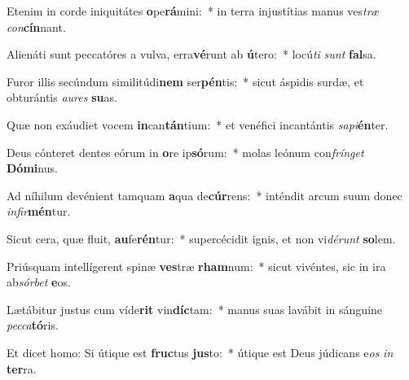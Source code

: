 \item Etenim in corde iniquitátes \textbf{o}pe\textbf{rá}mini:~* in terra injustítias manus ves\textit{træ} \textit{con}\textbf{cín}nant.
\item Alienáti sunt peccatóres a vulva, erra\textbf{vé}runt ab \textbf{ú}tero:~* locú\textit{ti} \textit{sunt} \textbf{fal}sa.
\item Furor illis secúndum similitúdi\textbf{nem} ser\textbf{pén}tis:~* sicut áspidis surdæ, et obturántis \textit{au}\textit{res} \textbf{su}as.
\item Quæ non exáudiet vocem \textbf{in}can\textbf{tán}tium:~* et venéfici incantántis \textit{sa}\textit{pi}\textbf{én}ter.
\item Deus cónteret dentes eórum in \textbf{o}re ip\textbf{só}rum:~* molas leónum con\textit{frín}\textit{get} \textbf{Dó}\textbf{mi}nus.
\item Ad níhilum devénient tamquam \textbf{a}qua de\textbf{cúr}rens:~* inténdit arcum suum donec \textit{in}\textit{fir}\textbf{mén}tur.
\item Sicut cera, quæ fluit, \textbf{au}fe\textbf{rén}tur:~* supercécidit ignis, et non vi\textit{dé}\textit{runt} \textbf{so}lem.
\item Priúsquam intellígerent spinæ \textbf{ves}træ \textbf{rham}num:~* sicut vivéntes, sic in ira ab\textit{sór}\textit{bet} \textbf{e}os.
\item Lætábitur justus cum víde\textbf{rit} vin\textbf{díc}tam:~* manus suas lavábit in sánguine \textit{pec}\textit{ca}\textbf{tó}ris.
\item Et dicet homo: Si útique est \textbf{fruc}tus \textbf{jus}to:~* útique est Deus júdicans e\textit{os} \textit{in} \textbf{ter}ra.
